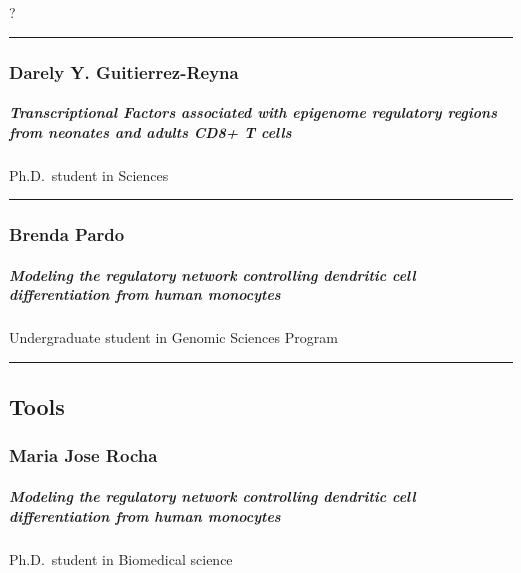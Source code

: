 \documentclass[]{article}
\let\oldsubparagraph\subparagraph
\renewcommand{\subparagraph}[1]{\oldsubparagraph{#1}\mbox{}}
\begin{document}
?

\begin{center}\rule{0.5\linewidth}{\linethickness}\end{center}

\subsubsection{Darely Y.
Guitierrez-Reyna}\label{darely-y.-guitierrez-reyna}

\subparagraph{ Transcriptional Factors associated with epigenome
regulatory regions from neonates and adults CD8+ T
cells}\label{transcriptional-factors-associated-with-epigenome-regulatory-regions-from-neonates-and-adults-cd8-t-cells}

Ph.D.~student in Sciences

\begin{center}\rule{0.5\linewidth}{\linethickness}\end{center}

\subsubsection{Brenda Pardo}\label{brenda-pardo}

\subparagraph{ Modeling the regulatory network controlling dendritic
cell differentiation from human
monocytes}\label{modeling-the-regulatory-network-controlling-dendritic-cell-differentiation-from-human-monocytes-1}

Undergraduate student in Genomic Sciences Program

\begin{center}\rule{0.5\linewidth}{\linethickness}\end{center}

\subsection{Tools}\label{tools}

\subsubsection{Maria Jose Rocha}\label{maria-jose-rocha}

\subparagraph{ Modeling the regulatory network controlling dendritic
cell differentiation from human
monocytes}\label{modeling-the-regulatory-network-controlling-dendritic-cell-differentiation-from-human-monocytes-2}

Ph.D.~student in Biomedical science
\end{document}
